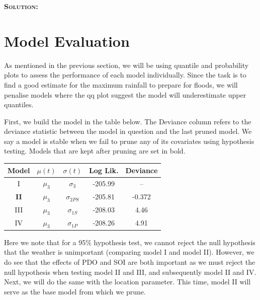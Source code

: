 \documentclass[12pt,oneside]{article}
\newenvironment{solution}
    {\textbf{\textsc{Solution:}}\\}
    {\newpage}
\begin{document}
\begin{solution}
\section*{Model Evaluation}
As mentioned in the previous section, we will be using quantile and probability plots to assess the performance of each model individually. Since the task is to find a good estimate for the maximum rainfall to prepare for floods, we will penalise models where the qq plot suggest the model will underestimate upper quantiles.

\noindent First, we build the model in the table below. The Deviance column refers to the deviance statistic between the model in question and the last pruned model. We say a model is stable when we fail to prune any of its covariates using hypothesis testing. Models that are kept after pruning are set in bold.
\begin{center}
    \begin{tabular}{||c||c|c|c|c||}\hline
     Model& $\mu(t)$ & $\sigma(t)$&Log Lik.& Deviance \\\hline
     I& $\mu_3$ & $\sigma_3$ & -205.99 & -- \\\hline
     \textbf{II}&$\mu_3$ & $\sigma_{2PS}$ & -205.81 & -0.372  \\\hline
     III& $\mu_3$ & $\sigma_{1S}$ & -208.03 & 4.46\\\hline
     IV& $\mu_3$ & $\sigma_{1P}$ & -208.26 & 4.91 \\\hline
\end{tabular}
\end{center}
Here we note that for a 95\% hypothesis test, we cannot reject the null hypothesis that the weather is unimportant (comparing model I and model II). However, we do see that the effects of PDO and SOI are both important as we must reject the null hypothesis when testing model II and III, and subsequently model II and IV. Next, we will do the same with the location parameter. This time, model II will serve as the base model from which we prune.


\end{solution}
\end{document}
